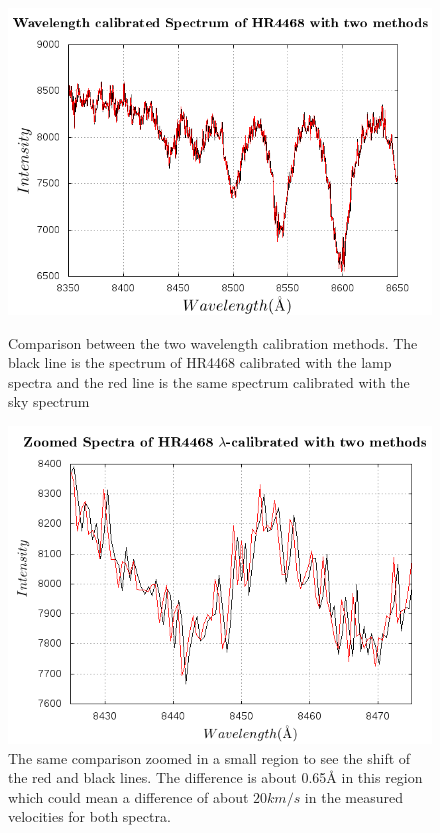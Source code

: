 \begin{figure}[H]
  \centering
  \begin{minipage}[b]{0.49\textwidth}
    \includegraphics[width=\textwidth]{images/Espectros.png}
    \caption[Comparison between the two wavelength calibration methods]{Comparison between the two wavelength calibration methods. The black line is the spectrum of HR4468 calibrated with the lamp spectra and the red line is the same spectrum calibrated with the sky spectrum}
  \end{minipage}
  \hfill
  \begin{minipage}[b]{0.49\textwidth}
    \includegraphics[width=\textwidth]{images/Espectros2.png}
    \caption[Zoomed comparison between the two wavelength calibration methods]{The same comparison zoomed in a small region to see the shift of the red and black lines. The difference is about 0.65$\textrm{\AA}$ in this region which could mean a difference of about $20km/s$ in the measured velocities for both spectra.}
  \end{minipage}
\end{figure}

